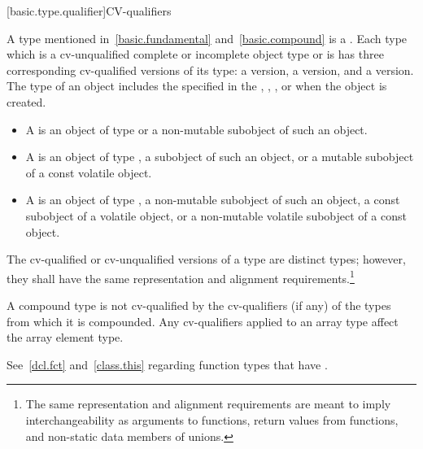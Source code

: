 [basic.type.qualifier]{CV-qualifiers}

\pnum
{}%
%
%
A type mentioned in~\ref{basic.fundamental} and~\ref{basic.compound} is
a . Each type which is a
cv-unqualified complete or incomplete object type or is
 has three corresponding cv-qualified
versions of its type: a  version, a
 version, and a
 version. The
type of an object includes the 
specified in the ,
,
, or
 when the object is created.
\begin{itemize}
\item A  is an object of type  or a
  non-mutable subobject of such an object.

\item A  is an object of type
  , a subobject of such an object, or a mutable
  subobject of a const volatile object.

\item A  is an object of type
  , a non-mutable subobject of such an object,
  a const subobject of a volatile object, or a non-mutable volatile
  subobject of a const object.
\end{itemize}
The cv-qualified or
cv-unqualified versions of a type
are distinct types; however, they shall have the same representation and
alignment requirements.\footnote{The same representation
and alignment requirements are meant to imply
interchangeability as arguments to functions, return values from
functions, and non-static data members of unions.}

\pnum
{}%
A compound type is not cv-qualified by the
cv-qualifiers (if any) of the types from which it is compounded. Any
cv-qualifiers applied to an array type
affect the array element type.

\pnum
See~\ref{dcl.fct} and~\ref{class.this} regarding function
types that have .


